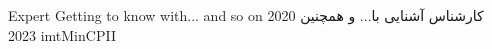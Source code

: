 
\jobPositionC
{Expert}
{Getting to know with... and so on}
{کارشناس}
{آشنایی با... و همچنین}
{\parttime}
{2020}
{2023}
{imtMinCPII}
